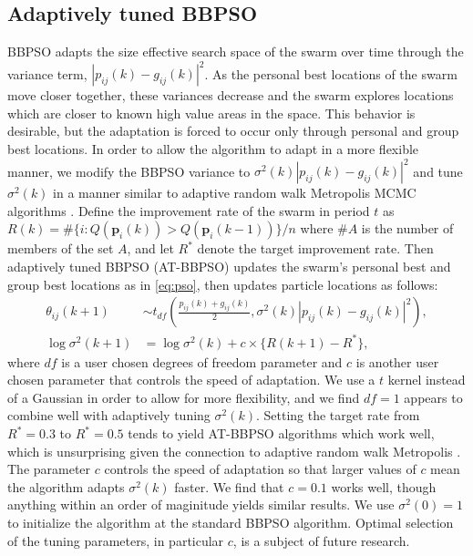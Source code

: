 \documentclass[cmbright]{staauth}
\begin{document}
\subsection{Adaptively tuned BBPSO}\label{subsec:ATBBPSO}
BBPSO adapts the size effective search space of the swarm over time through the variance term, $|p_{ij}(k) - g_{ij}(k)|^2$. As the personal best locations of the swarm move closer together, these variances decrease and the swarm explores locations which are closer to known high value areas in the space. This behavior is desirable, but the adaptation is forced to occur only through personal and group best locations. In order to allow the algorithm to adapt in a more flexible manner, we modify the BBPSO variance to $\sigma^2(k)|p_{ij}(k) - g_{ij}(k)|^2$ and tune $\sigma^2(k)$ in a manner similar to adaptive random walk Metropolis MCMC algorithms \citep{andrieu2008tutorial}. Define the improvement rate of the swarm in period $t$ as $R(k) = \#\{i:Q(\bm{p}_i(k))> Q(\bm{p}_i(k-1))\}/n$ where $\#A$ is the number of members of the set $A$, and let $R^*$ denote the target improvement rate. Then adaptively tuned BBPSO (AT-BBPSO) updates the swarm's personal best and group best locations as in \eqref{eq:pso}, then updates particle locations as follows:
\begin{align}\label{eq:at-bbpso}
\theta_{ij}(k+1) &\sim t_{df}\left(\frac{p_{ij}(k) + g_{ij}(k)}{2}, \sigma^2(k)|p_{ij}(k) - g_{ij}(k)|^2\right),\nonumber\\
\log \sigma^2(k+1) &= \log\sigma^2(k) + c\times\{R(k+1) - R^*\},
\end{align}
where $df$ is a user chosen degrees of freedom parameter and $c$ is another user chosen parameter that controls the speed of adaptation. We use a $t$ kernel instead of a Gaussian in order to allow for more flexibility, and we find $df=1$ appears to combine well with adaptively tuning $\sigma^2(k)$. Setting the target rate from $R^*=0.3$ to $R^*=0.5$ tends to yield AT-BBPSO algorithms which work well, which is unsurprising given the connection to adaptive random walk Metropolis \citep{gelman1996efficient}. The parameter $c$ controls the speed of adaptation so that larger values of $c$ mean the algorithm adapts $\sigma^2(k)$ faster. We find that $c=0.1$ works well, though anything within an order of maginitude yields similar results. We use $\sigma^2(0)=1$ to initialize the algorithm at the standard BBPSO algorithm. Optimal selection of the tuning parameters, in particular $c$, is a subject of future research.
\end{document}
